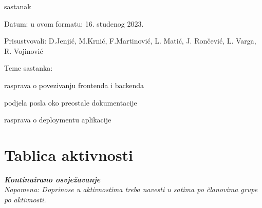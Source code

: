 \begin{packed_enum}
			
			\item  sastanak
			\item[] \begin{packed_item}
				\item Datum: u ovom formatu: 16. studenog 2023.
				\item Prisustvovali: D.Jenjić, M.Krnić, F.Martinović, L. Matić, J. Rončević, L. Varga, R. Vojinović
				\item Teme sastanka:
				\begin{packed_item}
					\item  rasprava o povezivanju frontenda i backenda
					\item  podjela posla oko preostale dokumentacije
					\item  rasprava o deploymentu aplikacije
				\end{packed_item}
			\end{packed_item}
			
			
			
		\end{packed_enum}
		
		\eject
		\section*{Tablica aktivnosti}
		
			\textbf{\textit{Kontinuirano osvježavanje}}\\
			
			 \textit{Napomena: Doprinose u aktivnostima treba navesti u satima po članovima grupe po aktivnosti.}

